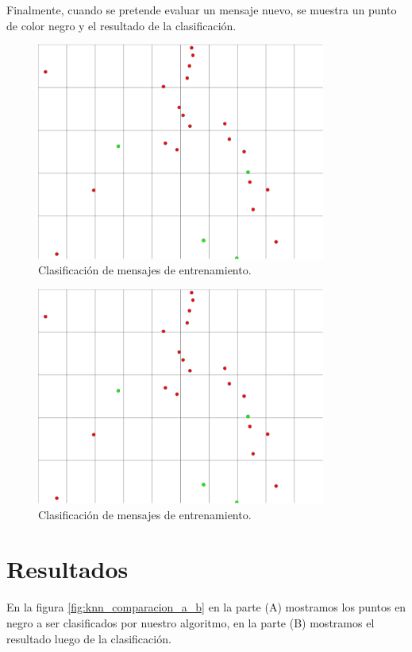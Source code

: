 Finalmente, cuando se pretende evaluar un mensaje nuevo, se muestra un punto de color negro y el resultado de la clasificación.

\begin{figure}[h!]
	\begin{center}
	\includegraphics[angle=0,width=9.5cm]{Graficos/knn_train}
	\caption{Clasificación de mensajes de entrenamiento.}
	\label{fig:knn_train}
  \end{center}
\end{figure}


\begin{figure}[h!]
	\begin{center}
	\includegraphics[angle=0,width=9.5cm]{Graficos/knn_train_results}
	\caption{Clasificación de mensajes de entrenamiento.}
	\label{fig:knn_train_results}
  \end{center}
\end{figure}


\section{Resultados}

En la figura  \ref{fig:knn_comparacion_a_b}   en la parte (A) mostramos los puntos en negro a ser clasificados por nuestro algoritmo, en la parte (B) mostramos el resultado luego de la clasificación.


